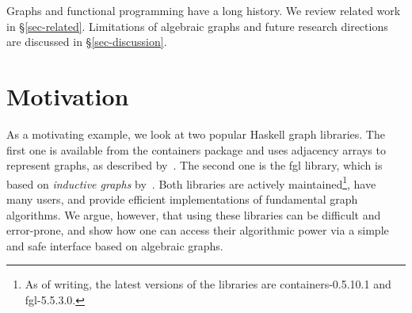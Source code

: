 Graphs and functional programming have a long history. We review related
work in \S\ref{sec-related}. Limitations of algebraic graphs and future
research directions are discussed in \S\ref{sec-discussion}.

\section{Motivation}\label{sec-motivation}

As a motivating
example, we look at two popular Haskell graph libraries. The first one is
available from the \textsf{containers} package and uses adjacency arrays
to represent graphs,
as described by~\citet{1995_king_graphs}. The second one
is the \textsf{fgl} library, which is based on \emph{inductive graphs}
by~\citet{2001_erwig_inductive}. Both libraries are
actively maintained\footnote{As of writing, the latest versions of the libraries
are \textsf{containers-0.5.10.1} and \textsf{fgl-5.5.3.0}.},
have many users, and provide efficient implementations of
fundamental graph algorithms. We argue, however, that using these libraries
can be difficult and error-prone, and show how one can access their algorithmic
power via a simple and safe interface based on algebraic graphs.

